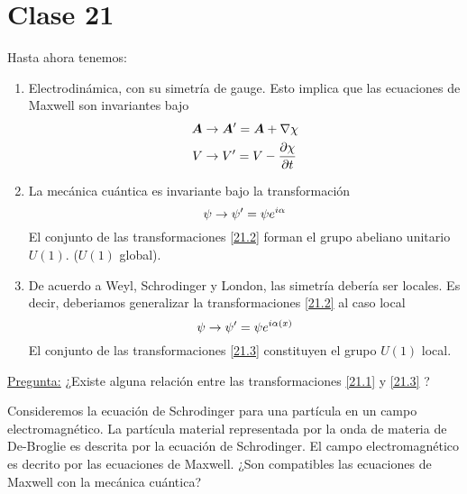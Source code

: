\section{Clase 21}
Hasta ahora tenemos:
\begin{enumerate}
	\item Electrodinámica, con su simetría de gauge. Esto implica que las ecuaciones de Maxwell son invariantes bajo
	\begin{equation}\label{21.1}
	\begin{split}
  \vb*{A}&\to \vb*{A}'=\vb*{A}+\nabla\chi \\
  V&\to V'=V-\pdv{\chi}{t}
  \end{split} 
\end{equation}
\item La mecánica cuántica es invariante bajo la transformación
 \begin{equation}\label{21.2}
  \psi\to \psi'=\psi e^{i\alpha }
\end{equation}
El conjunto de las transformaciones \eqref{21.2} forman el grupo abeliano unitario $U(1)$. ($U(1)$ global).

\item De acuerdo a Weyl, Schrodinger y London, las simetría debería ser locales. Es decir, deberiamos generalizar  la transformaciones \eqref{21.2} al caso local
\begin{equation}\label{21.3}
  \psi\to \psi'=\psi e^{i\alpha(x) }
\end{equation}
El conjunto de las transformaciones \eqref{21.3} constituyen el grupo $U(1)$ local.


\end{enumerate}
\underline{Pregunta:} ¿Existe alguna relación entre las transformaciones \eqref{21.1} y \eqref{21.3} ?

Consideremos la ecuación de Schrodinger para una partícula en un campo electromagnético. La partícula material representada por la onda de materia de De-Broglie es descrita por la ecuación de Schrodinger. El campo electromagnético es decrito por las ecuaciones de Maxwell. ¿Son compatibles las ecuaciones de Maxwell con la mecánica cuántica?

